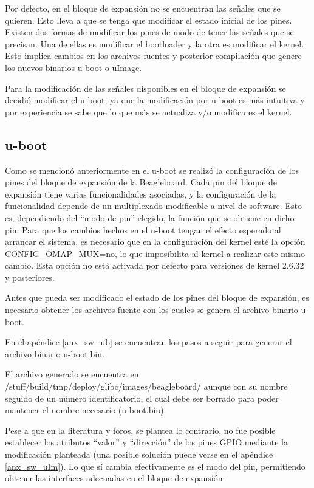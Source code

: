 \bigskip
Por defecto, en el bloque de expansión no se encuentran las señales que se quieren. Esto 
lleva a que se tenga que modificar el estado inicial de los pines. 
Existen dos formas de modificar los pines de modo de tener las señales que se precisan. Una de ellas es modificar el bootloader y la otra es modificar el kernel. Esto implica cambios en los archivos fuentes y posterior compilación que genere los nuevos binarios u-boot o uImage. 

\bigskip
Para la modificación de las señales disponibles en el bloque de expansión se decidió modificar el u-boot, ya que la modificación por u-boot es más intuitiva y por experiencia se sabe que lo que más se actualiza y/o modifica es el kernel. 

\subsection{u-boot}
Como se mencionó anteriormente en el u-boot se realizó la configuración de los pines del bloque de expansión de la Beagleboard. 
Cada pin del bloque de expansión tiene varias funcionalidades asociadas, y la configuración de la 
funcionalidad depende de un multiplexado modificable a nivel de software. Esto es, dependiendo del “modo de pin” elegido, la función que se obtiene en dicho pin.
Para que los cambios hechos en el u-boot tengan el efecto esperado al arrancar el sistema, es necesario que en la configuración del kernel esté la opción CONFIG\_OMAP\_MUX=no, lo que imposibilita al kernel a realizar este mismo cambio. Esta opción no está activada por defecto para versiones de kernel 2.6.32 y posteriores. 

\bigskip
Antes que pueda ser modificado el estado de los pines del bloque de expansión,
es necesario obtener los archivos fuente con los cuales se genera el archivo binario u-boot.

En el apéndice \ref{anx_sw_ub} se encuentran los pasos a seguir para generar el archivo binario u-boot.bin.

\bigskip
El archivo generado se encuentra en /stuff/build/tmp/deploy/glibc/images/beagleboard/ aunque con su nombre seguido de un número identificatorio, el cual debe ser borrado para poder mantener el nombre necesario (u-boot.bin).

\bigskip
Pese a que en la literatura y foros, se plantea lo contrario, no fue posible establecer los atributos “valor” y “dirección” de los pines GPIO mediante la modificación planteada (una posible solución puede verse en el apéndice \ref{anx_sw_uIm}). Lo que sí cambia efectivamente es el modo del pin, permitiendo obtener las interfaces adecuadas en el bloque de expansión.

